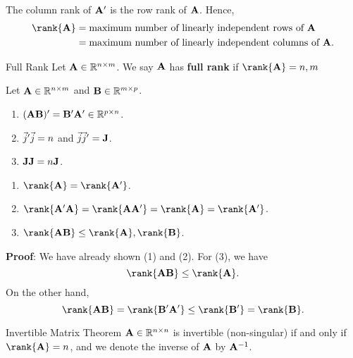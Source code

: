 \begin{Remark}{}{}
    The column rank of $ \mathbf{A}' $ is the row rank of $ \mathbf{A} $. Hence,
    \begin{align*}
        \rank{\Matrix{A}}
         & =\text{maximum number of linearly independent rows of }\Matrix{A}     \\
         & =\text{maximum number of linearly independent columns of }\Matrix{A}.
    \end{align*}
\end{Remark}
\begin{Definition}{Full Rank}{}
    Let $ \mathbf{A}\in\mathbb{R}^{n\times m} $. We say $ \mathbf{A} $ has \textbf{full rank}
    if $ \rank{\Matrix{A}}=\min{n,m} $
\end{Definition}
\begin{Theorem}{}{}
    Let $ \mathbf{A}\in\mathbb{R}^{n\times m} $ and $ \mathbf{B}\in\mathbb{R}^{m\times p} $.
    \begin{enumerate}[(1)]
        \item $ (\mathbf{AB})'=\mathbf{B}'\mathbf{A}'\in\mathbb{R}^{p\times n} $.
        \item $ \vec{j}'\vec{j}=n $ and $ \vec{j}\vec{j}'=\mathbf{J} $.
        \item $ \mathbf{J}\mathbf{J}=n \mathbf{J} $.
    \end{enumerate}
\end{Theorem}
\begin{Theorem}{}{}
    \begin{enumerate}[(1)]
        \item $ \rank{\Matrix{A}}=\rank{\Matrix{A}'} $.
        \item $ \rank{\Matrix{A}'\Matrix{A}}=\rank{\Matrix{A}\Matrix{A}'}=\rank{\Matrix{A}}=\rank{\Matrix{A}'} $.
        \item $ \rank{\Matrix{AB}}\le \min{\rank{\Matrix{A}},\rank{\Matrix{B}}} $.
    \end{enumerate}
    \tcblower{}
    \textbf{Proof}: We have already shown (1) and (2). For (3), we have
    \[ \rank{\Matrix{AB}}\le \rank{\Matrix{A}}. \]
    On the other hand,
    \[ \rank{\Matrix{AB}}=\rank{\Matrix{B}'\Matrix{A}'}\le \rank{\Matrix{B}'}=\rank{\Matrix{B}}. \]
\end{Theorem}
\begin{Remark}{Invertible Matrix Theorem}{}
    $ \mathbf{A}\in\mathbb{R}^{n\times n} $ is invertible (non-singular) if and only if $ \rank{\Matrix{A}}=n $,
    and we denote the inverse of $ \mathbf{A} $ by $ \mathbf{A}^{-1} $.
\end{Remark}
